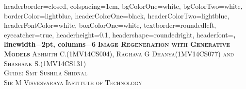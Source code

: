 \documentclass[a3paper,fontscale=.9]{baposter} %
\begin{document}
\begin{poster}
{
headerborder=closed, %
colspacing=1em, %
bgColorOne=white, %
bgColorTwo=white, %
borderColor=lightblue, %
headerColorOne=black, %
headerColorTwo=lightblue, %
headerFontColor=white, %
boxColorOne=white, %
textborder=roundedleft, %
eyecatcher=true, %
headerheight=0.1\textheight, %
headershape=roundedright, %
headerfont=\Large\bf\textsc, %
linewidth=2pt, %
columns=6
}
%
{} %
{\bf\textsc{Image Regeneration with Generative Models}} %
{\textsc{ Abhijith C.(1MV14CS004), Raghava G Dhanya(1MV14CS077) and Shashank S.(1MV14CS131)\\Guide: Smt Sushila Shidnal\\ Sir M Visvesvaraya Institute of Technology }} %
{}%




\end{poster}
\end{document}
